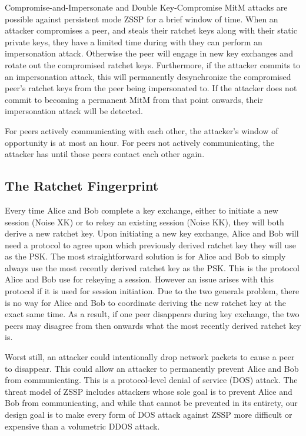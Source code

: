\documentclass{article}
\begin{document}
Compromise-and-Impersonate and Double Key-Compromise MitM attacks are possible against persistent mode ZSSP for a brief window of time. When an attacker compromises a peer, and steals their ratchet keys along with their static private keys, they have a limited time during with they can perform an impersonation attack. Otherwise the peer will engage in new key exchanges and rotate out the compromised ratchet keys. Furthermore, if the attacker commits to an impersonation attack, this will permanently desynchronize the compromised peer's ratchet keys from the peer being impersonated to. If the attacker does not commit to becoming a permanent MitM from that point onwards, their impersonation attack will be detected.

For peers actively communicating with each other, the attacker's window of opportunity is at most an hour. For peers not actively communicating, the attacker has until those peers contact each other again.

\subsection{The Ratchet Fingerprint}

Every time Alice and Bob complete a key exchange, either to initiate a new session (Noise XK) or to rekey an existing session (Noise KK), they will both derive a new ratchet key. Upon initiating a new key exchange, Alice and Bob will need a protocol to agree upon which previously derived ratchet key they will use as the PSK. The most straightforward solution is for Alice and Bob to simply always use the most recently derived ratchet key as the PSK. This is the protocol Alice and Bob use for rekeying a session. However an issue arises with this protocol if it is used for session initiation. Due to the two generals problem, there is no way for Alice and Bob to coordinate deriving the new ratchet key at the exact same time. As a result, if one peer disappears during key exchange, the two peers may disagree from then onwards what the most recently derived ratchet key is.

Worst still, an attacker could intentionally drop network packets to cause a peer to disappear. This could allow an attacker to permanently prevent Alice and Bob from communicating. This is a protocol-level denial of service (DOS) attack. The threat model of ZSSP includes attackers whose sole goal is to prevent Alice and Bob from communicating, and while that cannot be prevented in its entirety, our design goal is to make every form of DOS attack against ZSSP more difficult or expensive than a volumetric DDOS attack.
\end{document}
